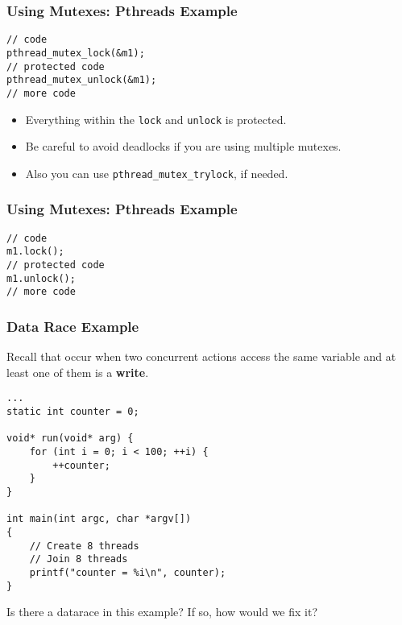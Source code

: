 \documentclass[aspectratio=43]{beamer}
\newenvironment{changemargin}[1]{%
  \begin{list}{}{%
    \setlength{\topsep}{0pt}%
    \setlength{\leftmargin}{#1}%
    \setlength{\rightmargin}{1em}
    \setlength{\listparindent}{\parindent}%
    \setlength{\itemindent}{\parindent}%
    \setlength{\parsep}{\parskip}%
  }%
  \item[]}{\end{list}}
\begin{document}
\begin{frame}[fragile]
  \frametitle{Using Mutexes: Pthreads Example}

\begin{changemargin}{1.5cm}
  \begin{lstlisting}
// code
pthread_mutex_lock(&m1);
// protected code
pthread_mutex_unlock(&m1);
// more code
  \end{lstlisting}
  \vfill
  \begin{itemize}
    \item Everything within the {\tt lock} and {\tt unlock} is protected.
    \item Be careful to avoid deadlocks if you are using multiple mutexes.
    \item Also you can use {\tt pthread\_mutex\_trylock}, if needed.
  \end{itemize}
\end{changemargin}
\end{frame}

\begin{frame}[fragile]
  \frametitle{Using Mutexes: Pthreads Example}

\begin{changemargin}{1.5cm}
  \begin{lstlisting}
// code
m1.lock(); 
// protected code
m1.unlock();
// more code
  \end{lstlisting}
\end{changemargin}
\end{frame}


\begin{frame}[fragile]
  \frametitle{Data Race Example}

\begin{changemargin}{1.5cm}
  Recall that  occur when two concurrent actions access the same
  variable and at least one of them is a {\bf write}.


  \begin{lstlisting}
...
static int counter = 0;

void* run(void* arg) {
    for (int i = 0; i < 100; ++i) {
        ++counter;
    }
}

int main(int argc, char *argv[])
{
    // Create 8 threads
    // Join 8 threads
    printf("counter = %i\n", counter);
}
  \end{lstlisting}

Is there a datarace in this example? If so, how would we fix it?
\end{changemargin}

\end{frame}
\end{document}
